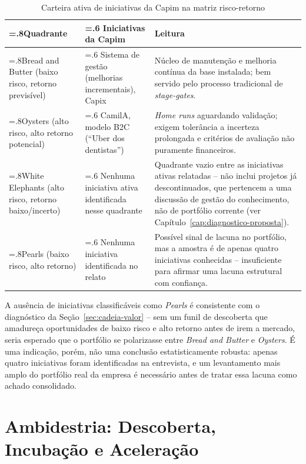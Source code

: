 \begin{table}[h]
  \centering
  \caption{Carteira ativa de iniciativas da Capim na matriz risco-retorno}
  \label{tab:portfolio}
  \begin{tabularx}{\textwidth}{>{\hsize=.8\hsize}X>{\hsize=.6\hsize}X>{\hsize=1.6\hsize}X}
    \toprule
    \textbf{Quadrante} & \textbf{Iniciativas da Capim} & \textbf{Leitura} \\
    \midrule
    Bread and Butter (baixo risco, retorno previsível) & Sistema de gestão (melhorias incrementais), Capix & Núcleo de manutenção e melhoria contínua da base instalada; bem servido pelo processo tradicional de \textit{stage-gates}. \\
    Oysters (alto risco, alto retorno potencial) & CamilA, modelo B2C (``Uber dos dentistas'') & \textit{Home runs} aguardando validação; exigem tolerância a incerteza prolongada e critérios de avaliação não puramente financeiros. \\
    White Elephants (alto risco, retorno baixo/incerto) & Nenhuma iniciativa ativa identificada nesse quadrante & Quadrante vazio entre as iniciativas ativas relatadas -- não inclui projetos já descontinuados, que pertencem a uma discussão de gestão do conhecimento, não de portfólio corrente (ver Capítulo~\ref{cap:diagnostico-proposta}). \\
    Pearls (baixo risco, alto retorno) & Nenhuma iniciativa identificada no relato & Possível sinal de lacuna no portfólio, mas a amostra é de apenas quatro iniciativas conhecidas -- insuficiente para afirmar uma lacuna estrutural com confiança. \\
    \bottomrule
  \end{tabularx}
\end{table}

A ausência de iniciativas classificáveis como \textit{Pearls} é consistente com o diagnóstico da Seção~\ref{sec:cadeia-valor} -- sem um funil de descoberta que amadureça oportunidades de baixo risco e alto retorno antes de irem a mercado, seria esperado que o portfólio se polarizasse entre \textit{Bread and Butter} e \textit{Oysters}. É uma indicação, porém, não uma conclusão estatisticamente robusta: apenas quatro iniciativas foram identificadas na entrevista, e um levantamento mais amplo do portfólio real da empresa é necessário antes de tratar essa lacuna como achado consolidado.

\section{Ambidestria: Descoberta, Incubação e Aceleração}
\label{sec:ambidestria}


